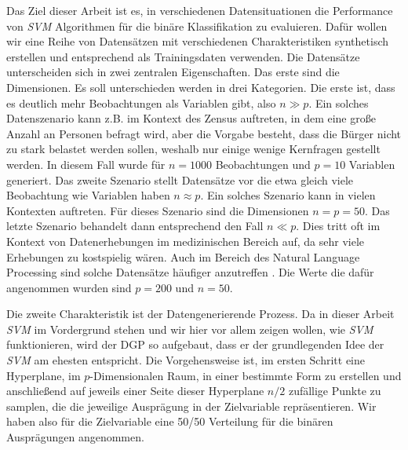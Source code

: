 \documentclass[
]{article}
\begin{document}
Das Ziel dieser Arbeit ist es, in verschiedenen Datensituationen die
Performance von \textit{SVM} Algorithmen für die binäre Klassifikation
zu evaluieren. Dafür wollen wir eine Reihe von Datensätzen mit
verschiedenen Charakteristiken synthetisch erstellen und entsprechend
als Trainingsdaten verwenden. Die Datensätze unterscheiden sich in zwei
zentralen Eigenschaften. Das erste sind die Dimensionen. Es soll
unterschieden werden in drei Kategorien. Die erste ist, dass es deutlich
mehr Beobachtungen als Variablen gibt, also \(n \gg p\). Ein solches
Datenszenario kann z.B. im Kontext des Zensus auftreten, in dem eine
große Anzahl an Personen befragt wird, aber die Vorgabe besteht, dass
die Bürger nicht zu stark belastet werden sollen, weshalb nur einige
wenige Kernfragen gestellt werden. In diesem Fall wurde für \(n=1000\)
Beobachtungen und \(p=10\) Variablen generiert. Das zweite Szenario
stellt Datensätze vor die etwa gleich viele Beobachtung wie Variablen
haben \(n \approx p\). Ein solches Szenario kann in vielen Kontexten
auftreten. Für dieses Szenario sind die Dimensionen \(n=p=50\). Das
letzte Szenario behandelt dann entsprechend den Fall \(n \ll p\). Dies
tritt oft im Kontext von Datenerhebungen im medizinischen Bereich auf,
da sehr viele Erhebungen zu kostspielig wären. Auch im Bereich des
Natural Language Processing sind solche Datensätze häufiger anzutreffen
\parencite{scholzComparisonClassificationMethods2021}. Die Werte die
dafür angenommen wurden sind \(p=200\) und \(n=50\).

Die zweite Charakteristik ist der Datengenerierende Prozess. Da in
dieser Arbeit \textit{SVM} im Vordergrund stehen und wir hier vor allem
zeigen wollen, wie \textit{SVM} funktionieren, wird der DGP so
aufgebaut, dass er der grundlegenden Idee der \textit{SVM} am ehesten
entspricht. Die Vorgehensweise ist, im ersten Schritt eine Hyperplane,
im \(p\)-Dimensionalen Raum, in einer bestimmte Form zu erstellen und
anschließend auf jeweils einer Seite dieser Hyperplane \(n/2\) zufällige
Punkte zu samplen, die die jeweilige Ausprägung in der Zielvariable
repräsentieren. Wir haben also für die Zielvariable eine 50/50
Verteilung für die binären Ausprägungen angenommen.
\end{document}
